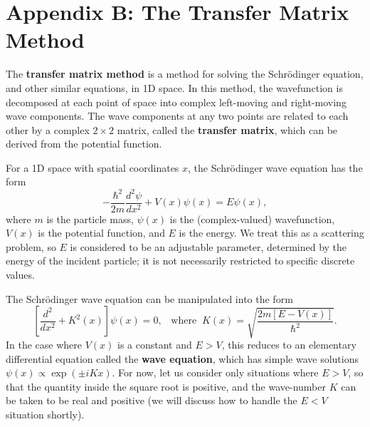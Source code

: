 \documentclass[pra,12pt]{revtex4}
\begin{document}
\section*{Appendix B: The Transfer Matrix Method}

The \textbf{transfer matrix method} is a method for solving the
Schr\"odinger equation, and other similar equations, in 1D space.  In
this method, the wavefunction is decomposed at each point of space
into complex left-moving and right-moving wave components.  The wave
components at any two points are related to each other by a complex
$2\times2$ matrix, called the \textbf{transfer matrix}, which can be
derived from the potential function.

For a 1D space with spatial coordinates $x$, the Schr\"odinger wave
equation has the form
$$-\frac{\hbar^2}{2m}\frac{d^2\psi}{dx^2} + V(x) \psi(x) = E\psi(x),$$
where $m$ is the particle mass, $\psi(x)$ is the (complex-valued)
wavefunction, $V(x)$ is the potential function, and $E$ is the energy.
We treat this as a scattering problem, so $E$ is considered to be an
adjustable parameter, determined by the energy of the incident
particle; it is not necessarily restricted to specific discrete
values.

The Schr\"odinger wave equation can be manipulated into the form
$$\left[\frac{d^2}{dx^2} + K^2(x)\right] \psi(x) = 0, \;\;\; \mathrm{where}\;\;K(x) = \sqrt{\frac{2m[E-V(x)]}{\hbar^2}}.$$
In the case where $V(x)$ is a constant and $E > V$, this reduces to an
elementary differential equation called the \textbf{wave equation},
which has simple wave solutions $\psi(x)\propto \exp(\pm iKx)$.  For
now, let us consider only situations where $E > V$, so that the
quantity inside the square root is positive, and the wave-number $K$
can be taken to be real and positive (we will discuss how to handle
the $E < V$ situation shortly).
\end{document}

